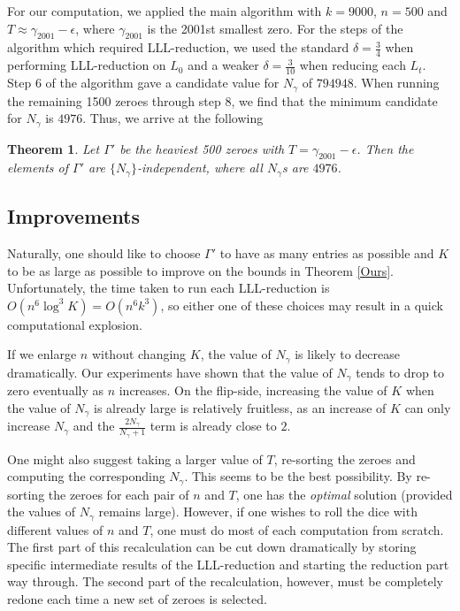 \documentclass{article}
\newtheorem{theorem}{Theorem}
\numberwithin{equation}{section}
\begin{document}
For our computation, we applied the main algorithm with $k = 9000$, $n = 500$ and $T \approx \gamma_{2001}-\epsilon$, where $\gamma_{2001}$ is the 2001st smallest zero. For the steps of the algorithm which required LLL-reduction, we used the standard $\delta = \frac34$ when performing LLL-reduction on $L_0$ and a weaker $\delta=\frac{3}{10}$ when reducing each $L_t$. Step 6 of the algorithm gave a candidate value for $N_\gamma$ of $794948$. When running the remaining 1500 zeroes through step 8, we find that the minimum candidate for $N_\gamma$ is $4976$. Thus, we arrive at the following

\begin{theorem}
Let $\Gamma'$ be the heaviest 500 zeroes with $T=\gamma_{2001}-\epsilon$. Then the elements of $\Gamma'$ are $\{N_\gamma\}$-independent, where all $N_\gamma$s are $4976$.
\end{theorem}

\subsection{Improvements}

Naturally, one should like to choose $\Gamma'$ to have as many entries as possible and $K$ to be as large as possible to improve on the bounds in Theorem \ref{Ours}. Unfortunately, the time taken to run each LLL-reduction is $O(n^{6}\log^3K) = O(n^6k^3)$, so either one of these choices may result in a quick computational explosion.

If we enlarge $n$ without changing $K$, the value of $N_\gamma$ is likely to decrease dramatically. Our experiments have shown that the value of $N_\gamma$ tends to drop to zero eventually as $n$ increases. On the flip-side, increasing the value of $K$ when the value of $N_\gamma$ is already large is relatively fruitless, as an increase of $K$ can only increase $N_\gamma$ and the $\frac{2N_\gamma}{N_\gamma+1}$ term is already close to $2$.

One might also suggest taking a larger value of $T$, re-sorting the zeroes and computing the corresponding $N_\gamma$. This seems to be the best possibility. By re-sorting the zeroes for each pair of $n$ and $T$, one has the {\it optimal} solution (provided the values of $N_\gamma$ remains large). However, if one wishes to roll the dice with different values of $n$ and $T$, one must do most of each computation from scratch. The first part of this recalculation can be cut down dramatically by storing specific intermediate results of the LLL-reduction and starting the reduction part way through. The second part of the recalculation, however, must be completely redone each time a new set of zeroes is selected. 
\end{document}
